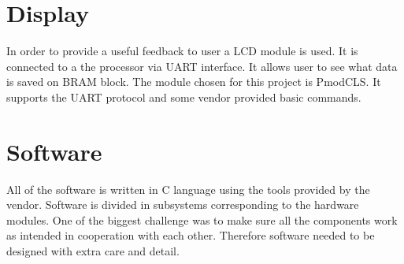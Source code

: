 \section{Display}
In order to provide a useful feedback to user a LCD module is used. It is connected to a the processor via UART interface. It allows user to see what data is saved on BRAM block.
The module chosen for this project is PmodCLS. It supports the UART protocol and some vendor provided basic commands. 

\section{Software}
All of the software is written in C language using the tools provided by the vendor. Software is divided in subsystems corresponding to the hardware modules. 
One of the biggest challenge was to make sure all the components work as intended in cooperation with each other. Therefore software needed to be designed with extra care and detail. 
 
